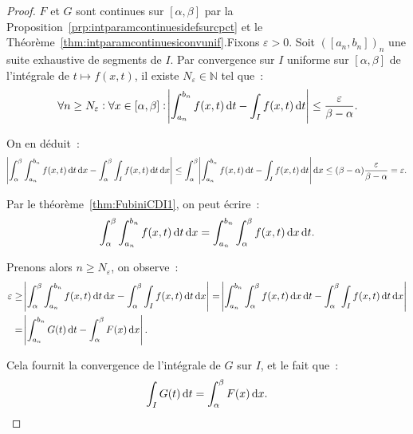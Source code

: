 \documentclass{report}
\theoremstyle{definition}
\theoremstyle{remark}
\numberwithin{equation}{section}
\newcommand{\N}{\mathbb N}
\begin{document}
			\begin{proof} $F$ et $G$ sont continues sur $[\alpha, \beta]$ par la Proposition~\ref{prp:intparamcontinuesidefsurcpct} et le
			Théorème~\ref{thm:intparamcontinuesiconvunif}.Fixons $\varepsilon > 0$. Soit $([a_n, b_n])_n$ une suite exhaustive de segments de $I$. Par convergence
			sur $I$ uniforme sur $[\alpha, \beta]$ de l'intégrale de $t \mapsto f(x, t)$, il existe $N_\varepsilon \in \N$ tel que~:
			\begin{equation}
				\forall n \geq N_\varepsilon : \forall x \in [\alpha, \beta] : \abs {\int_{a_n}^{b_n} f(x, t)\dif t - \int_I f(x, t)\dif t}
				\leq \frac \varepsilon{\beta-\alpha}.
			\end{equation}

			On en déduit~:
			\begin{equation}
				\abs {\int_\alpha^\beta\int_{a_n}^{b_n} f(x, t)\dif t\dif x - \int_\alpha^\beta\int_I f(x, t)\dif t\dif x}
				\leq \int_\alpha^\beta\abs {\int_{a_n}^{b_n}f(x, t)\dif t - \int_I f(x, t)\dif t}\dif x
				\leq (\beta-\alpha)\frac \varepsilon{\beta-\alpha} = \varepsilon.
			\end{equation}

			Par le théorème~\ref{thm:FubiniCDI1}, on peut écrire~:
			\begin{equation}
				\int_\alpha^\beta\int_{a_n}^{b_n}f(x, t)\dif t\dif x = \int_{a_n}^{b_n}\int_\alpha^\beta f(x, t)\dif x\dif t.
			\end{equation}

			Prenons alors $n \geq N_\varepsilon$, on observe~:
			\begin{align}
				\varepsilon &\geq \abs {\int_\alpha^\beta\int_{a_n}^{b_n} f(x, t)\dif t\dif x - \int_\alpha^\beta\int_I f(x, t)\dif t\dif x}
				= \abs {\int_{a_n}^{b_n}\int_\alpha^\beta f(x, t)\dif x\dif t - \int_\alpha^\beta\int_I f(x, t)\dif t\dif x} \\
				&= \abs {\int_{a_n}^{b_n}G(t)\dif t - \int_\alpha^\beta F(x)\dif x}.
			\end{align}

			Cela fournit la convergence de l'intégrale de $G$ sur $I$, et le fait que~:
			\begin{equation}
				\int_I G(t)\dif t = \int_\alpha^\beta F(x)\dif x.
			\end{equation}
			\end{proof}
\end{document}
